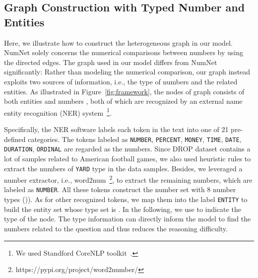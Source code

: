 \documentclass{article}
\begin{document}
\subsection{Graph Construction with Typed Number and Entities}
\label{sec:graph}


Here, we illustrate how to construct the heterogeneous graph  in our model.
NumNet solely concerns the numerical comparisons between numbers by using the directed edges.
The graph used in our model differs from NumNet significantly: Rather than modeling the numerical comparison, our graph instead exploits two sources of information, i.e., the type of numbers and the related entities.
As illustrated in Figure~\ref{fig:framework}, the nodes of graph  consists of both entities  and numbers , both of which are recognized by an external name entity recognition (NER) system~\footnote{We used Standford CoreNLP toolkit~\cite{DBLP:conf/acl/ManningSBFBM14}.}.

Specifically, the NER software labels each token in the text into one of 21 pre-defined categories.
The tokens labeled as \texttt{NUMBER}, \texttt{PERCENT}, \texttt{MONEY}, \texttt{TIME}, \texttt{DATE}, \texttt{DURATION}, \texttt{ORDINAL} are regarded as the numbers.
Since DROP dataset contains a lot of samples related to American football games, we also used heuristic rules to extract the numbers of \texttt{YARD} type in the data samples.
Besides, we leveraged a number extractor, i.e., word2num~\footnote{https://pypi.org/project/word2number/}, to extract the remaining numbers, which are labeled as \texttt{NUMBER}.
All these tokens construct the number set  with 8 number types ()). 
As for other recognized tokens,  we map them into the label \texttt{ENTITY} to build the entity set  whose type set  is .
In the following, we use  to indicate the type of the node.
The type information can directly inform the model to find the numbers related to the question and thus reduces the reasoning difficulty.
\end{document}
